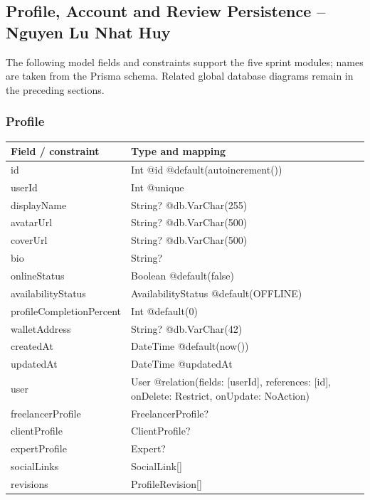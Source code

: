 \subsection{Profile, Account and Review Persistence -- Nguyen Lu Nhat Huy}
The following model fields and constraints support the five sprint modules; names are taken from the Prisma schema. Related global database diagrams remain in the preceding sections.
\subsubsection{Profile}
\begin{longtable}{|L{3.3cm}|L{10.8cm}|}\hline
Field / constraint & Type and mapping \\ \hline
id & Int @id @default(autoincrement()) \\ \hline
userId & Int @unique \\ \hline
displayName & String? @db.VarChar(255) \\ \hline
avatarUrl & String? @db.VarChar(500) \\ \hline
coverUrl & String? @db.VarChar(500) \\ \hline
bio & String? \\ \hline
onlineStatus & Boolean @default(false) \\ \hline
availabilityStatus & AvailabilityStatus @default(OFFLINE) \\ \hline
profileCompletionPercent & Int @default(0) \\ \hline
walletAddress & String? @db.VarChar(42) \\ \hline
createdAt & DateTime @default(now()) \\ \hline
updatedAt & DateTime @updatedAt \\ \hline
user & User @relation(fields: [userId], references: [id], onDelete: Restrict, onUpdate: NoAction) \\ \hline
freelancerProfile & FreelancerProfile? \\ \hline
clientProfile & ClientProfile? \\ \hline
expertProfile & Expert? \\ \hline
socialLinks & SocialLink[] \\ \hline
revisions & ProfileRevision[] \\ \hline
\end{longtable}
